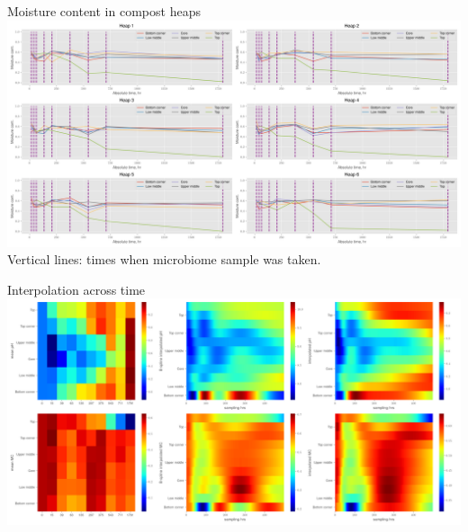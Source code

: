 \documentclass[mathserif,11pt]{beamer}
\begin{document}
\begin{frame}{Moisture content in compost heaps}
\centering
	\includegraphics[width=\textwidth]{Figures/mc_per_heap.png}\\
	Vertical lines: times when microbiome sample was taken.
\end{frame}
\begin{frame}{Interpolation across time}
\centering
	\includegraphics[width=\textwidth]{Figures/interpolation_ph_mc.png}\\
\end{frame}
\end{document}
